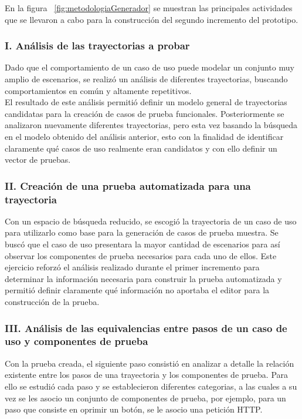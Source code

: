	En la figura ~\ref{fig:metodologiaGenerador} se muestran las principales actividades que se llevaron a cabo para la construcción del segundo incremento del prototipo.
	
	
\subsubsection{I. Análisis de las trayectorias a probar}

	Dado que el comportamiento de un caso de uso puede modelar un conjunto muy amplio de escenarios, se realizó un análisis de diferentes trayectorias, buscando comportamientos en común y altamente repetitivos.\\
	
	El resultado de este análisis permitió definir un modelo general de trayectorias candidatas para la creación de casos de prueba funcionales. Posteriormente se analizaron nuevamente diferentes trayectorias, pero esta vez basando la búsqueda en el modelo obtenido del análisis anterior, esto con la finalidad de identificar claramente qué casos de uso realmente eran candidatos y con ello definir un vector de pruebas.\\ 
	
	
\subsubsection{II. Creación de una prueba automatizada para una trayectoria}

	Con un espacio de búsqueda reducido, se escogió la trayectoria de un caso de uso para utilizarlo como base para la generación de casos de prueba muestra. Se buscó que el caso de uso presentara la mayor cantidad de escenarios para así observar los componentes de prueba necesarios para cada uno de ellos. Este ejercicio reforzó el análisis realizado durante el primer incremento para determinar la información necesaria para construir la prueba automatizada y permitió definir claramente qué información no aportaba el editor para la construcción de la prueba.
	
\subsubsection{III. Análisis de las equivalencias entre pasos de un caso de uso y componentes de  prueba}

	Con la prueba creada, el siguiente paso consistió en analizar a detalle la relación existente entre los pasos de una trayectoria y los componentes de prueba. Para ello se estudió cada paso y se establecieron diferentes categorias, a las cuales a su vez se les asocio un conjunto de componentes de prueba, por ejemplo, para un paso que consiste en oprimir un botón, se le asocio una petición HTTP.
	
